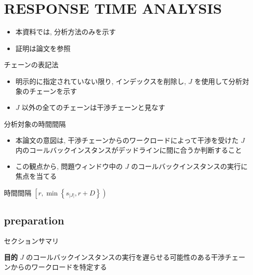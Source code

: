 

\section{RESPONSE TIME ANALYSIS}
\label{sec: responce_time_analysis}

\begin{frame}{}
    \begin{itemize}
        \item 本資料では, 分析方法のみを示す
        \item 証明は論文を参照
    \end{itemize}
\end{frame}

\begin{frame}{チェーンの表記法}
    \begin{itemize}
        \item 明示的に指定されていない限り, インデックスを削除し, $J$ を使用して分析対象のチェーンを示す
        \item $J$ 以外の全てのチェーンは干渉チェーンと見なす
    \end{itemize}
\end{frame}

\begin{frame}{分析対象の時間間隔}
    \begin{itemize}
        \item 本論文の意図は, 干渉チェーンからのワークロードによって干渉を受けた $J$ 内のコールバックインスタンスがデッドラインに間に合うか判断すること
        \item この観点から, 問題ウィンドウ中の $J$ のコールバックインスタンスの実行に焦点を当てる
    \end{itemize}
    \begin{definition}[$J$ の問題ウィンドウ]
        時間間隔 $\left[r, \min \left\{s_{|J|}, r+D\right\}\right)$
    \end{definition}
\end{frame}


\subsection{preparation}
\label{ssec: preparation}

\begin{frame}{セクションサマリ}
    \begin{itembox}[l]{\textbf{目的}}
        $J$ のコールバックインスタンスの実行を遅らせる可能性のある干渉チェーンからのワークロードを特定する
    \end{itembox}
\end{frame}

